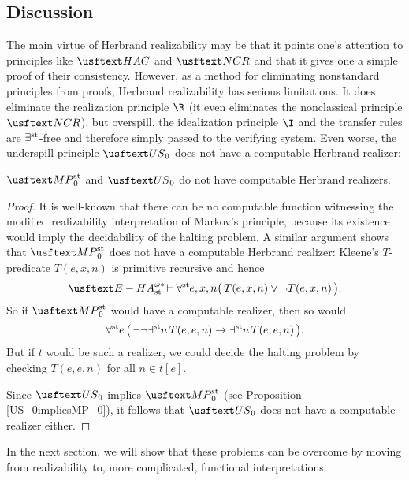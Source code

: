 \subsection{Discussion}

The main virtue of Herbrand realizability may be that it points one's attention to principles like $\HAC$ and $\NCR$ and that it gives one a simple proof of their consistency. However, as a method for eliminating nonstandard principles from proofs, Herbrand realizability has serious limitations. It does eliminate the realization principle $\R$ (it even eliminates the nonclassical principle $\NCR$), but overspill, the idealization principle $\I$ and the transfer rules are $\exists^{\operatorname{st}}$-free and therefore simply passed to the verifying system. Even worse, the underspill principle $\US_0$ does not have a computable Herbrand realizer:
\begin{prop}
$\MP_0$ and $\US_0$ do not have computable Herbrand realizers.
\end{prop}
\begin{proof}
It is well-known that there can be no computable function witnessing the modified realizability interpretation of Markov's principle, because its existence would imply the decidability of the halting problem. A similar argument shows that $\MP_0$ does not have a computable Herbrand realizer: Kleene's $T$-predicate $T(e, x, n)$ is primitive recursive and hence 
\[ \ehaststar \vdash \forallst e, x, n \big( \, T(e,x, n) \lor \lnot T(e, x, n) \, \big). \]
So if $\MP_0$ would have a computable realizer, then so would 
\[ \forall^{\operatorname{st}{}}\! e \, \big( \, \lnot\lnot \exists^{\operatorname{st}{}}\! n\,  T(e,e, n) \to \exists^{\operatorname{st}{}}\! n \, T(e, e, n) \, \big). \]
But if $t$ would be such a realizer, we could decide the halting problem by checking $T(e, e, n)$ for all $n \in t[e]$.

Since $\US_0$ implies $\MP_0$ (see Proposition \ref{US_0impliesMP_0}), it follows that $\US_0$ does not have a computable realizer either.
\end{proof}

In the next section, we will show that these problems can be overcome by moving from realizability to, more complicated, functional interpretations.